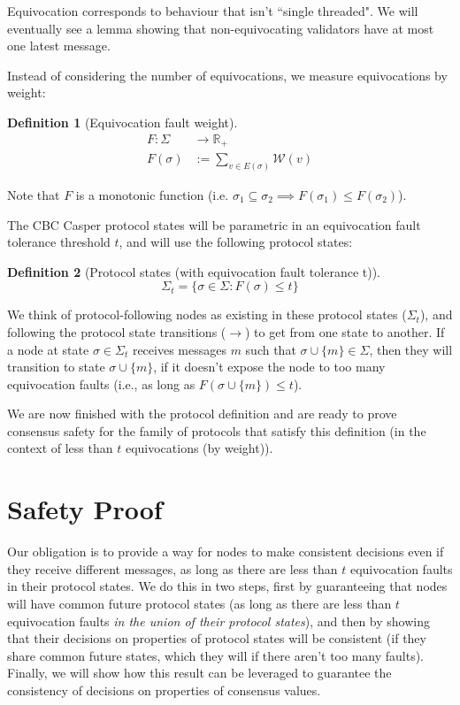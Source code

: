 \documentclass{article}
\theoremstyle{definition}
\newtheorem{defn}{Definition}[section]
\begin{document}
Equivocation corresponds to behaviour that isn't ``single threaded". We will eventually see a lemma showing that non-equivocating validators have at most one latest message.

Instead of considering the number of equivocations, we measure equivocations by weight:

\begin{defn}[Equivocation fault weight]
\begin{align}
F: \Sigma &\to \mathbb{R}_+ \\
F(\sigma) &:= \sum_{v \in E(\sigma)} \mathcal{W}(v)
\end{align}
\end{defn}

Note that $F$ is a monotonic function (i.e. $\sigma_1 \subseteq \sigma_2 \implies F(\sigma_1) \leq F(\sigma_2)$).

The CBC Casper protocol states will be parametric in an equivocation fault tolerance threshold $t$, and will use the following protocol states:

\begin{defn}[Protocol states (with equivocation fault tolerance t)]
$$
\Sigma_t = \{\sigma \in \Sigma : F(\sigma) \leq t\}
$$
\end{defn}

We think of protocol-following nodes as existing in these protocol states ($\Sigma_t$), and following the protocol state transitions ($\to$) to get from one state to another. If a node at state $\sigma \in \Sigma_t$ receives messages $m$ such that $\sigma \cup \{m\} \in \Sigma$, then they will transition to state $\sigma \cup \{m\}$, if it doesn't expose the node to too many equivocation faults (i.e., as long as $F(\sigma \cup \{m\}) \leq t$).

We are now finished with the protocol definition and are ready to prove consensus safety for the family of protocols that satisfy this definition (in the context of less than $t$ equivocations (by weight)).


\pagebreak
\section{Safety Proof}

Our obligation is to provide a way for nodes to make consistent decisions even if they receive different messages, as long as there are less than $t$ equivocation faults in their protocol states. We do this in two steps, first by guaranteeing that nodes will have common future protocol states (as long as there are less than $t$ equivocation faults \emph{in the union of their protocol states}), and then by showing that their decisions on properties of protocol states will be consistent (if they share common future states, which they will if there aren't too many faults). Finally, we will show how this result can be leveraged to guarantee the consistency of decisions on properties of consensus values.
\end{document}
